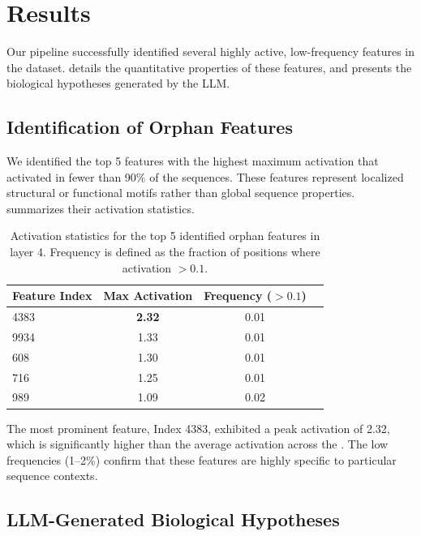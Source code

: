 \section{Results}
\label{sec:results}

Our pipeline successfully identified several highly active, low-frequency features in the \swissprot dataset.  details the quantitative properties of these features, and  presents the biological hypotheses generated by the LLM.

\subsection{Identification of Orphan Features}
\label{sec:results:features}

We identified the top 5 features with the highest maximum activation that activated in fewer than 90\% of the sequences. These features represent localized structural or functional motifs rather than global sequence properties.  summarizes their activation statistics.

\begin{table}[h]
\centering
\caption{Activation statistics for the top 5 identified orphan features in \esm layer 4. Frequency is defined as the fraction of positions where activation $> 0.1$.}
\begin{tabular}{@{}lccc@{}}
\toprule
\textbf{Feature Index} & \textbf{Max Activation} & \textbf{Frequency ($>0.1$)} \\
\midrule
4383 & {\bf 2.32} & 0.01 \\
9934 & 1.33 & 0.01 \\
608  & 1.30 & 0.01 \\
716  & 1.25 & 0.01 \\
989  & 1.09 & 0.02 \\
\bottomrule
\end{tabular}
\label{tab:feature_stats}
\end{table}

The most prominent feature, Index 4383, exhibited a peak activation of 2.32, which is significantly higher than the average activation across the \sae. The low frequencies (1--2\%) confirm that these features are highly specific to particular sequence contexts.

\subsection{LLM-Generated Biological Hypotheses}
\label{sec:results:hypotheses}

